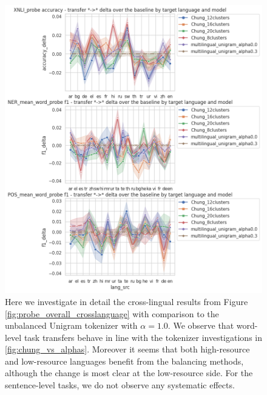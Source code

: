 \begin{figure}[H]
    \centering
    \includegraphics[width=\textwidth]{img/temp/probe_overall_crosslanguage_over_baseline.png}
    \caption{Here we investigate in detail the cross-lingual results from Figure \ref{fig:probe_overall_crosslanguage} with comparison to the unbalanced Unigram tokenizer with $\alpha=1.0$. We observe that word-level task transfers behave in line with the tokenizer investigations in \ref{fig:chung_vs_alphas}. Moreover it seems that both high-resource and low-resource languages benefit from the balancing methods, although the change is most clear at the low-resource side. For the sentence-level tasks, we do not observe any systematic effects.}
    \label{fig:probe_overall_crosslanguage_over_baseline}
\end{figure}



